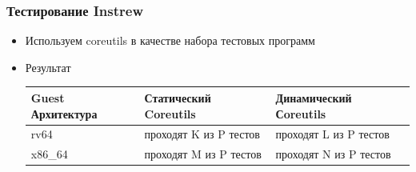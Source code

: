 \documentclass{beamer}
\begin{document}
\begin{frame}[fragile]
	\frametitle{Тестирование Instrew}
	\begin{itemize}
		\item Используем coreutils в качестве набора тестовых программ

		\item Результат
		      \begin{center}

			      \footnotesize
			      \begin{tabular}{ |p{3cm}|p{3cm}|p{3cm}|}
				      \hline
				      Guest Архитектура& Статический Coreutils &Динамический Сoreutils\\
				      \hline
				      rv64  & проходят K из P тестов &проходят L из P тестов\\
				      x86\_64& проходят M из P тестов  & проходят N из P тестов \\
				      \hline
			      \end{tabular}
		      \end{center}

	\end{itemize}
\end{frame}
\end{document}
